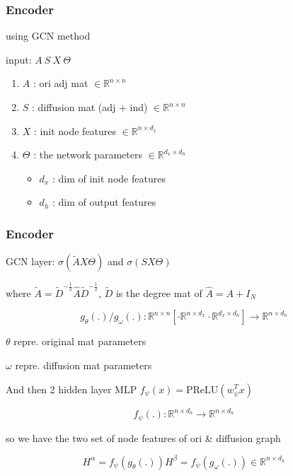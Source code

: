 \documentclass[UTF8]{beamer}
\begin{document}
    \begin{frame}
        \frametitle{Encoder}
        using GCN method
    
        input: \(A\ S\ X\ \Theta\)
        \begin{enumerate}
            \item \(A\) : ori adj mat \(\in\mathbb{R}^{n\times n}\)
            \item \(S\) : diffusion mat (adj + ind) \(\in\mathbb{R}^{n\times n}\)
            \item \(X\) : init node features \(\in\mathbb{R}^{n\times d_x}\)
            \item \(\Theta\) : the network parameters \(\in\mathbb{R}^{d_x\times d_h}\)
                \begin{itemize}
                    \item \(d_x\) : dim of init node features
                    \item \(d_h\) : dim of output features
                \end{itemize}
        \end{enumerate}
        
    \end{frame}
    
    \begin{frame}
        \frametitle{Encoder}

        GCN layer: \(\sigma(\tilde{A}X\Theta)\) and \(\sigma(SX\Theta)\)
        \vspace{.5cm}
        
        where \(\tilde{A} = \tilde{D}^{-\frac{1}{2}}\hat{A}\tilde{D}^{-\frac{1}{2}}\), \(\tilde{D}\) is the degree mat of \(\hat{A} = A+I_N\)
        
        \begin{equation*}
            g_\theta(.)/g_\omega(.) : \mathbb{R}^{n\times n}[\cdot\mathbb{R}^{n\times d_x}\cdot\mathbb{R}^{d_x\times d_h}] \rightarrow \mathbb{R}^{n\times d_h}
        \end{equation*}
        
        \(\theta\) repre. original mat parameters

        \(\omega\) repre. diffusion mat parameters  
        \vspace{.5cm}
        
        And then 2 hidden layer MLP \(f_\psi(x) = \text{PReLU}(w_\psi^Tx)\)
        
        \begin{equation*}
            f_\psi(.) : \mathbb{R}^{n\times d_h} \rightarrow \mathbb{R}^{n\times d_h}
        \end{equation*}
        
        so we have the two set of node features of ori \& diffusion graph
        
        \begin{equation*}
            H^\alpha = f_\psi(g_\theta(.))
            H^\beta = f_\psi(g_\omega(.)) \in\mathbb{R}^{n\times d_h}
        \end{equation*}        
    
    \end{frame}
\end{document}
